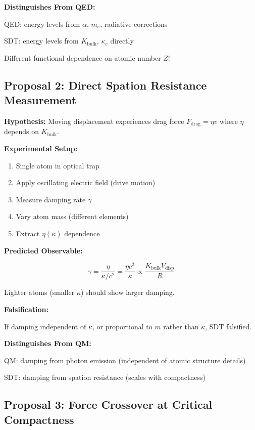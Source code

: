 \textbf{Distinguishes From QED:}

QED: energy levels from $\alpha$, $m_e$, radiative corrections

SDT: energy levels from $K_{\text{bulk}}$, $\kappa_e$ directly

Different functional dependence on atomic number $Z$!

\subsection{Proposal 2: Direct Spation Resistance Measurement}

\textbf{Hypothesis:} Moving displacement experiences drag force $F_{\text{drag}} = \eta v$ where $\eta$ depends on $K_{\text{bulk}}$.

\textbf{Experimental Setup:}

\begin{enumerate}
\item Single atom in optical trap
\item Apply oscillating electric field (drive motion)
\item Measure damping rate $\gamma$
\item Vary atom mass (different elements)
\item Extract $\eta(\kappa)$ dependence
\end{enumerate}

\textbf{Predicted Observable:}

\begin{equation}
\gamma = \frac{\eta}{\kappa/c^2} = \frac{\eta c^2}{\kappa} \propto \frac{K_{\text{bulk}} V_{\text{disp}}}{R}
\end{equation}

 Lighter atoms (smaller $\kappa$) should show larger damping.

\textbf{Falsification:}

If damping independent of $\kappa$, or proportional to $m$ rather than $\kappa$, SDT falsified.

\textbf{Distinguishes From QM:}

QM: damping from photon emission (independent of atomic structure details)

SDT: damping from spation resistance (scales with compactness)

\subsection{Proposal 3: Force Crossover at Critical Compactness}

